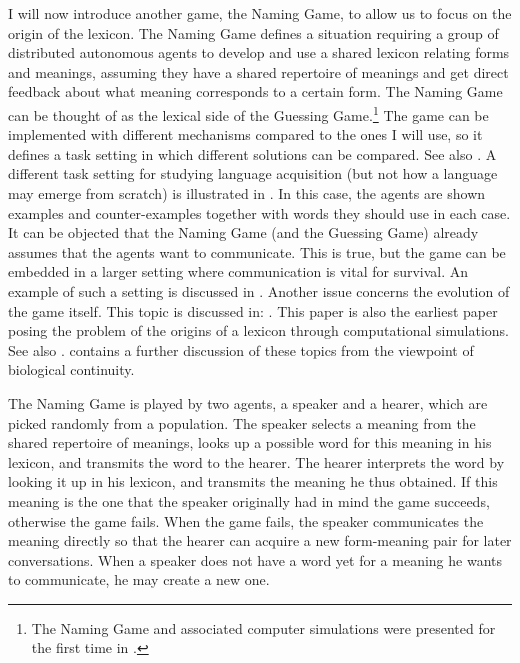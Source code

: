 I will now introduce another game, the Naming
Game, to allow us to focus on the origin of the lexicon.
The Naming Game defines a situation requiring 
a group of distributed autonomous agents to develop and 
use a shared lexicon relating forms and meanings, 
assuming they have a shared repertoire of meanings and get 
direct feedback about what meaning corresponds to a
certain form. The Naming Game can be thought of 
as the lexical side of the Guessing Game.\footnote{
The Naming Game and associated computer simulations
were presented for the first time in \cite{Steels:1996a}.}
The game can be implemented with different
mechanisms compared to the ones I will use, so it defines a 
task setting in which different solutions can be compared. 
See also \cite{Hutchins:1995}.
A different task setting for studying language acquisition
(but not how a language may emerge from scratch) is 
illustrated in \cite{Regier:1996}. In this case, the agents
are shown examples and counter-examples together with 
words they should use in each case. 
\newline 
It can be objected
that the Naming Game (and the Guessing Game) already 
assumes that the agents want to communicate. 
This is true, but the game can be embedded in a larger
setting where communication is vital for survival. 
An example of such a setting is discussed in \cite{Werner:1991}. \newline
Another issue concerns
the evolution of the game itself. This topic is discussed in: 
\cite{Hurford:1989}. This paper is also
the earliest paper posing the problem of the origins of 
a lexicon through computational simulations. See also 
\cite{Oliphant:1996}. \cite{Hauser:1996}
contains a further discussion of these topics from the 
viewpoint of biological continuity.

The Naming Game is played by two agents, a speaker and 
a hearer, which are picked randomly from a population. 
The speaker selects a meaning from the shared repertoire
of meanings, looks up a possible word for this meaning 
in his lexicon, and transmits the word to the hearer. 
The hearer interprets the word by looking it up in his lexicon, 
and transmits the meaning he thus obtained. If this meaning 
is the one that the speaker originally had in mind the 
game succeeds, otherwise the game fails. When the game 
fails, the speaker communicates the meaning directly so 
that the hearer can acquire a new form-meaning pair 
for later conversations. When a speaker does not have a
word yet for a meaning he wants to communicate, he may create 
a new one. 

